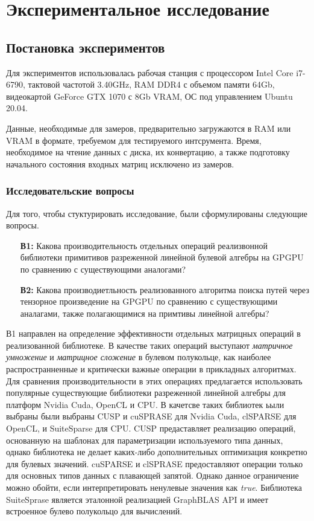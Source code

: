 \section{Экспериментальное исследование}

\subsection{Постановка экспериментов}

Для экспериментов использовалась рабочая станция с процессором Intel Core i7-6790, тактовой частотой 3.40GHz, RAM DDR4 с объемом памяти 64Gb, видеокартой GeForce GTX 1070 с 8Gb VRAM, ОС под управлением Ubuntu 20.04.

Данные, необходимые для замеров, предварительно загружаются в RAM или VRAM в формате, требуемом для тестируемого интсрумента. Время, необходимое на чтение данных с диска, их конвертацию, а также подготовку начального состояния входных матриц исключено из замеров. 

\subsubsection*{Исследовательские вопросы}

Для того, чтобы стуктурировать исследование, были сформулированы следующие вопросы.

\begin{itemize}
   \item[\textbf{В1:}] Какова производительность отдельных операций реализвонной библиотеки примитивов разреженной линейной булевой алгебры на GPGPU по сравнению с существующими аналогами?
   
   \item[\textbf{В2:}] Какова производиетльность реализованного алгоритма поиска путей через тензорное произведение на GPGPU  по сравнению с существующими аналагами, также полагающимися на примтивы линейной алгебры? 
\end{itemize}

В1 направлен на определение эффективности отдельных матрицных операций в реализованной библиотеке. В качестве таких операций выступают \textit{матричное умножение} и \textit{матрицное сложение} в булевом полукольце, как наиболее распространненные и критически важные операции в прикладных алгоритмах. Для сравнения производительности в этих операциях предлагается использовать популярные существующие библиотеки разреженной линейной алгебры для платформ Nvidia Cuda, OpenCL и CPU. В качетсве таких библиотек ьыли выбраны были выбраны CUSP и cuSPRASE для Nvidia Cuda, clSPARSE для OpenCL, и SuiteSparse для CPU. CUSP предаставляет реализацию операций, основанную на шаблонах для параметризации используемого типа данных, однако библиотека не делает каких-либо дополнительных оптимизация конкретно для булевых значений. cuSPARSE и clSPRASE предоставляют операции только для основных типов данных с плавающей запятой. Однако данное ограничение можно обойти, если интерпретировать ненулевые значения как \textit{true}. Библиотека SuiteSprase является эталонной реализацией GraphBLAS API и имеет встроенное булево полукольцо для вычислений.

